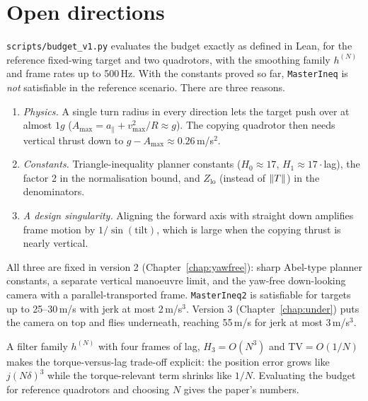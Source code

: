 \chapter{Open directions}
\label{chap:roadmap}

\begin{remark}
\texttt{scripts/budget\_v1.py} evaluates the budget exactly as defined in Lean, for the
reference fixed-wing target and two quadrotors, with the smoothing family
$h^{(N)}$ and frame rates up to 500\,Hz. With the constants proved so far,
\texttt{MasterIneq} is \emph{not} satisfiable in the reference scenario. There are three
reasons.
\begin{enumerate}
  \item \emph{Physics.} A single turn radius in every direction lets the target push
        over at almost $1g$ ($A_{\max}=a_\parallel+v_{\max}^2/R\approx g$). The
        copying quadrotor then needs vertical thrust down to $g-A_{\max}\approx0.26$\,m/s$^2$.
  \item \emph{Constants.} Triangle-inequality planner constants ($H_0\approx17$,
        $H_1\approx17\cdot$lag), the factor 2 in the normalisation bound, and $Z_{\mathrm{lo}}$
        (instead of $\lVert T \rVert$) in the denominators.
  \item \emph{A design singularity.} Aligning the forward axis with straight down
        amplifies frame motion by $1/\sin(\text{tilt})$, which is large when the copying
        thrust is nearly vertical.
\end{enumerate}
All three are fixed in version 2 (Chapter~\ref{chap:yawfree}): sharp Abel-type planner
constants, a separate vertical manoeuvre limit, and the yaw-free down-looking camera
with a parallel-transported frame. \texttt{MasterIneq2} is satisfiable for targets up to
25--30\,m/s with jerk at most 2\,m/s$^3$. Version 3 (Chapter~\ref{chap:under}) puts the
camera on top and flies underneath, reaching 55\,m/s for jerk at most 3\,m/s$^3$.
\end{remark}

\begin{remark}
A filter family $h^{(N)}$ with four frames of lag, $H_3=O(N^3)$ and $\mathrm{TV}=O(1/N)$
makes the torque-versus-lag trade-off explicit: the position error grows like
$j(N\delta)^3$ while the torque-relevant term shrinks like $1/N$. Evaluating the
budget for reference quadrotors and choosing $N$ gives the paper's numbers.
\end{remark}

